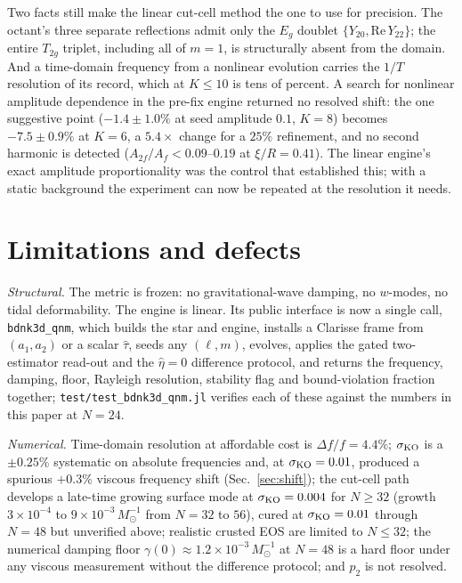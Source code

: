 \documentclass[aps,prd,reprint,amsmath,amssymb,nofootinbib,longbibliography,superscriptaddress]{revtex4-2}
\newcommand{\Msun}{M_\odot}
\newcommand{\KO}{\sigma_{\rm KO}}
\begin{document}
Two facts still make the linear cut-cell method the one to use for precision. The octant's three
separate reflections admit only the $E_g$ doublet $\{Y_{20},\mathrm{Re}\,Y_{22}\}$; the entire
$T_{2g}$ triplet, including all of $m=1$, is structurally absent from the domain. And a
time-domain frequency from a nonlinear evolution carries the $1/T$ resolution of its record,
which at $K\le10$ is tens of percent. A search for nonlinear amplitude dependence in the pre-fix
engine returned no resolved shift: the one suggestive point ($-1.4\pm1.0\%$ at seed amplitude
$0.1$, $K=8$) becomes $-7.5\pm0.9\%$ at $K=6$, a $5.4\times$ change for a $25\%$ refinement, and
no second harmonic is detected ($A_{2f}/A_f < 0.09$--$0.19$ at $\xi/R = 0.41$). The linear engine's
exact amplitude proportionality was the control that established this; with a static background
the experiment can now be repeated at the resolution it needs.

\section{Limitations and defects}
\label{sec:limits}

\emph{Structural.} The metric is frozen: no gravitational-wave damping, no $w$-modes, no tidal
deformability. The engine is linear. Its public interface is now a single call,
\texttt{bdnk3d\_qnm}, which builds the star and engine, installs a Clarisse frame from
$(a_1,a_2)$ or a scalar $\hat\tau$, seeds any $(\ell,m)$, evolves, applies the gated
two-estimator read-out and the $\hat\eta=0$ difference protocol, and returns the frequency,
damping, floor, Rayleigh resolution, stability flag and bound-violation fraction together;
\texttt{test/test\_bdnk3d\_qnm.jl} verifies each of these against the numbers in this paper at
$N=24$.

\emph{Numerical.} Time-domain resolution at affordable cost is $\Delta f/f = 4.4\%$; $\KO$ is a
$\pm0.25\%$ systematic on absolute frequencies and, at $\KO=0.01$, produced a spurious
$+0.3\%$ viscous frequency shift (Sec.~\ref{sec:shift}); the cut-cell path develops a late-time growing surface mode at
$\KO = 0.004$ for $N\ge32$ (growth $3\times10^{-4}$ to $9\times10^{-3}\,\Msun^{-1}$ from $N=32$
to $56$), cured at $\KO=0.01$ through $N=48$ but unverified above; realistic crusted EOS are
limited to $N\le32$; the numerical damping floor $\gamma(0)\approx1.2\times10^{-3}\,\Msun^{-1}$ at
$N=48$ is a hard floor under any viscous measurement without the difference protocol; and $p_2$
is not resolved.
\end{document}
